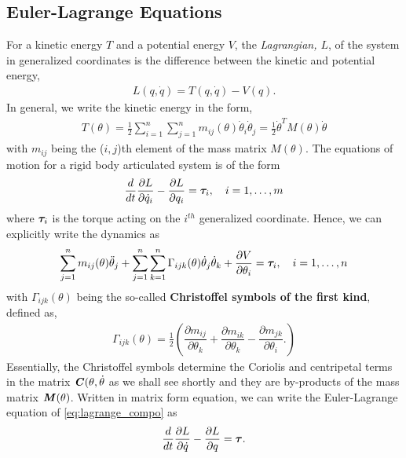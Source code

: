 \subsection{Euler-Lagrange Equations}
%
For a kinetic energy $T$ and a potential energy $V$, the \textit{Lagrangian, $L$}, of the system in generalized coordinates is the difference between the kinetic and potential energy, \ie
%
\begin{align}
L(q, \dot{q}) = T(q, \dot{q}) - V(q).
\label{eq:lagrange}
\end{align}
%
In general, we write the kinetic energy in the form, 
%
\begin{align}
	T(\theta) = \frac{1}{2} \sum_{i = 1}^{n} \sum_{j = 1}^{n}  m_{ij}(\theta) \dot{\theta}_i \dot{\theta}_j = \frac{1}{2} \dot{\theta}^T M(\theta) \dot{\theta}
\end{align}
% 
with $m_{ij}$ being the ($i, j$)th element of the mass matrix $M(\theta)$. 
%
The equations of motion for a rigid body articulated system is of the form
%
\begin{align}
\dfrac{d}{dt}\dfrac{\partial L}{\partial \dot{q}_i} - \dfrac{\partial L}{\partial q_i} = \bm{\tau}_i, \quad i = 1, \ldots, m
\label{eq:lagrange_compo}
\end{align}
%
where $\bm{\tau}_i$ is the torque acting on the $i^{th}$ generalized coordinate. Hence, we can explicitly write the dynamics as 
%
\begin{align}
\sum_{j=1}^{n} m_{ij}(\theta) \ddot{\theta}_j + \sum_{j = 1}^{n} \sum_{k = 1}^{n} \Gamma_{ijk}(\theta) \dot{\theta}_j \dot{\theta}_k + \dfrac{\partial V}{\partial \theta_i } = 	\bm{\tau}_i, \quad i = 1, \ldots, n
\end{align} 
%
with $\Gamma_{ijk}(\theta) $ being the so-called \textbf{Christoffel symbols of the first kind}, defined as, 
%
\begin{align}
	\Gamma_{ijk}(\theta)  = \frac{1}{2}\left(\dfrac{\partial m_{ij}}{\partial \theta_k} + \dfrac{\partial m_{ik}}{\partial \theta_k} - \dfrac{\partial m_{jk}}{\partial \theta_i}.
	\right)
\end{align}
%
Essentially, the Christoffel symbols determine the Coriolis and centripetal terms in the matrix $\textbf{\textit{C}}(\theta, \dot{\theta}$ as we shall see shortly and they are by-products of the mass matrix $\textbf{\textit{M}}(\theta)$. 
%
Written in matrix form equation, we can write the Euler-Lagrange equation of \eqref{eq:lagrange_compo} as
%
\begin{align}
\dfrac{d}{dt}\dfrac{\partial L}{\partial \dot{q}} - \dfrac{\partial L}{\partial q} = \bm{\tau}.
\label{eq:lagrange_deri}
\end{align}
